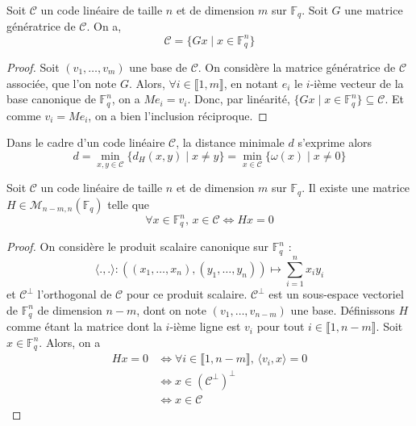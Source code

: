   \begin{proposition}
    Soit $\mathcal{C}$ un code linéaire de taille $n$ et de dimension $m$ sur $\mathbb{F}_q$. Soit $G$ une matrice génératrice de $\mathcal{C}$. On a,
    \[ \mathcal{C} = \{ Gx \mid x \in \mathbb{F}_q^n \} \]
  \end{proposition}

  \begin{proof}
    Soit $(v_1, \dots, v_m)$ une base de $\mathcal{C}$. On considère la matrice génératrice de $\mathcal{C}$ associée, que l'on note $G$.
    \newpar
    Alors, $\forall i \in \llbracket 1, m \rrbracket$, en notant $e_i$ le $i$-ième vecteur de la base canonique de $\mathbb{F}_q^n$, on a $Me_i = v_i$. Donc, par linéarité, $\{ Gx \mid x \in \mathbb{F}_q^n \} \subseteq \mathcal{C}$.
    Et comme $v_i = Me_i$, on a bien l'inclusion réciproque.
  \end{proof}

  \begin{remark}
    Dans le cadre d'un code linéaire $\mathcal{C}$, la distance minimale $d$ s'exprime alors
    \[ d = \min_{x,y \in \mathcal{C}} \{ d_H(x,y) \mid x \neq y \} = \min_{x \in \mathcal{C}} \{ \omega(x) \mid x \neq 0 \} \]
  \end{remark}

  \begin{proposition}
    Soit $\mathcal{C}$ un code linéaire de taille $n$ et de dimension $m$ sur $\mathbb{F}_q$. Il existe une matrice $H \in \mathcal{M}_{n-m,n}(\mathbb{F}_q)$ telle que
    \[ \forall x \in \mathbb{F}_q^n, \, x \in \mathcal{C} \iff Hx = 0 \]
  \end{proposition}

  \begin{proof}
    On considère le produit scalaire canonique sur $\mathbb{F}_q^n$ :
    \[ \langle ., . \rangle : ((x_1, \dots, x_n), (y_1, \dots, y_n)) \mapsto \sum_{i=1}^n x_iy_i \]
    et $\mathcal{C}^\perp$ l'orthogonal de $\mathcal{C}$ pour ce produit scalaire. $\mathcal{C}^\perp$ est un sous-espace vectoriel de $\mathbb{F}_q^n$ de dimension $n-m$, dont on note $(v_1, \dots, v_{n-m})$ une base. Définissons $H$ comme étant la matrice dont la $i$-ième ligne est $v_i$ pour tout $i \in \llbracket 1, n-m \rrbracket$.  Soit $x \in \mathbb{F}_q^n$. Alors, on a
    \begin{align*}
      Hx = 0 &\iff \forall i \in \llbracket 1, n-m \rrbracket, \, \langle v_i, x \rangle = 0 \\
      &\iff x \in (\mathcal{C}^\perp)^\perp \\
      &\iff x \in \mathcal{C}
    \end{align*}
  \end{proof}

